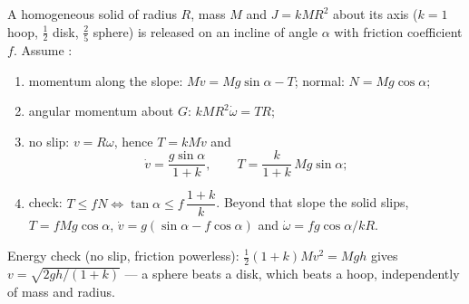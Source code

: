 \begin{method}\label{met:b2:rigid-body-mechanics:incline}
A homogeneous solid of radius $R$, mass $M$ and  $J =
kMR^2$ about its axis ($k = 1$ hoop, $\tfrac12$ disk, $\tfrac25$ sphere)
is released on an incline of angle $\alpha$ with friction coefficient
$f$. Assume :
\begin{enumerate}
  \item momentum along the slope: $M\dot v = Mg\sin\alpha - T$; normal:
        $N = Mg\cos\alpha$;
  \item angular momentum about $G$: $kMR^2\dot\omega = TR$;
  \item no slip: $v = R\omega$, hence $T = kM\dot v$ and
        \[
        \dot v = \frac{g\sin\alpha}{1 + k} , \qquad T = \frac{k}{1 + k}\,
        Mg\sin\alpha ;
        \]
  \item check: $T \le fN \iff \tan\alpha \le f\,\dfrac{1 + k}{k}$.
        Beyond that slope the solid slips, $T = fMg\cos\alpha$, $\dot v =
        g(\sin\alpha - f\cos\alpha)$ and $\dot\omega = fg\cos\alpha/kR$.
\end{enumerate}
Energy check (no slip, friction powerless): $\tfrac12(1 + k)Mv^2 =
Mgh$ gives $v = \sqrt{2gh/(1 + k)}$ --- a sphere beats a disk, which
beats a hoop, independently of mass and radius.
\end{method}

